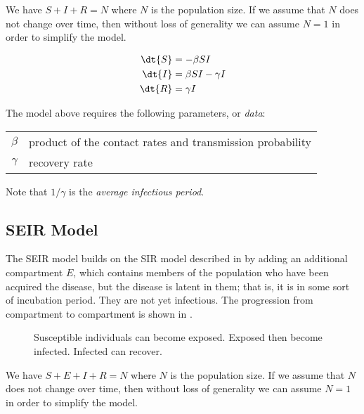 We have $S + I + R = N$ where $N$ is the population size.
If we assume that $N$ does not change over time,
then without loss of generality we can assume $N=1$ in order to simplify the model.

\begin{align}
    \dt{S} & =  - \beta S I \\%
    \dt{I} & = \beta S I - \gamma I \\%
    \dt{R} & = \gamma I%
\end{align}

The model above requires the following parameters,
or \textit{data}:

\begin{tabular}{cl}
    $\beta$ & product of the contact rates and transmission probability\\%
    $\gamma$ & recovery rate
\end{tabular}

Note that $1/\gamma$ is the \textit{average infectious period}.

\subsection{SEIR Model}
\label{subsec:infectious-disease-models:seir}

The SEIR model builds on the SIR model described in  by adding an additional compartment $E$,
which contains members of the population who have been acquired the disease,
but the disease is latent in them;
that is,
it is in some sort of incubation period.
They are not yet infectious.
The progression from compartment to compartment is shown in .

\begin{figure}
    \caption{
        \label{fig:compartment-flow-seir}
        Susceptible individuals can become exposed.
        Exposed then become infected.
        Infected can recover.
    }
\end{figure}

We have $S + E + I + R = N$ where $N$ is the population size.
If we assume that $N$ does not change over time,
then without loss of generality we can assume $N=1$ in order to simplify the model.


